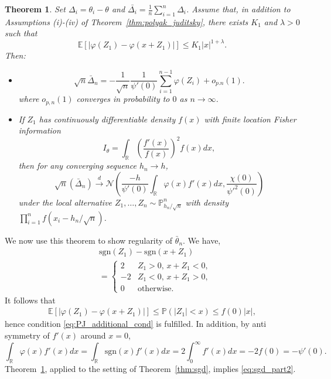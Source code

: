 \documentclass[letterpaper, 11pt]{IEEEtran}      %
\newtheorem{thm}{\bf{Theorem}}
\newcommand{\ex}[1]{\ensuremath{\mathbb{E}\left[ #1\right]}}
\newcommand{\sgn}{\mathrm{sgn} }
\newcommand{\Prob}{\mathbb{P} }
\newcommand{\Ncal}{\mathcal{N}}
\begin{document}
\begin{thm} \label{thm:normal_expansion}
Set $\Delta_i = \theta_i - \theta$ and
$\bar{\Delta_i} = \frac{1}{n} \sum_{i=1}^n \Delta_i$. Assume that, in addition to Assumptions (i)-(iv) of Theorem~\ref{thm:polyak_juditsky}, there exists $K_1$ and $\lambda>0$ such that
\begin{equation}
\ex{\left| \varphi(Z_1) - \varphi(x+Z_1)  \right|} \leq K_1 |x|^{1+\lambda}
\label{eq:PJ_additional_cond}. 
\end{equation}
Then:
\begin{itemize}
\item[(i)] \begin{equation}
\sqrt{n} \bar{\Delta}_n = -\frac{1}{\sqrt{n}} \frac{1}{\psi'(0)} \sum_{i=1}^{n-1} \varphi(Z_i)+ o_{p.n}(1). \label{eq:normal_expansion_lem}
\end{equation}
where $o_{p,n}(1)$ converges in probability to $0$ as $n\to \infty$.
\item[(ii)] If $Z_1$ has continuously differentiable density $f(x)$ with finite location Fisher information 
\[
I_\theta = \int_{\mathbb R} \left( \frac{f'(x)}{f(x)} \right)^2 f(x) dx,
\]
then for any converging sequence $h_n \to h$,
\[
\sqrt{n} \left( \bar{\Delta}_n \right) \overset{d}{\to} \Ncal\left( \frac{-h}{\psi'(0)} \int_{\mathbb R} \varphi(x) f'(x) dx  , \frac{\chi(0)}{\psi'^2(0)} \right)
\]
under the local alternative $Z_1,\ldots,Z_n \sim \Prob^n_{h_n/\sqrt{n}}$ with density $\prod_{i=1}^n f(x_i-h_n/\sqrt{n})$.
\end{itemize}
\end{thm}
We now use this theorem to show regularity of $\bar{\theta}_n$. We have, 
\begin{align*}
& %
\sgn(Z_1) - \sgn(x + Z_1) \\
& = \begin{cases}
2 & Z_1 > 0,\, x+Z_1<0, \\
-2 & Z_1 <0, \, x+Z_1>0, \\
0 & \text{otherwise}. 
\end{cases}
\end{align*}
It follows that
\begin{align*}
\ex{ \left| \varphi(Z_1) - \varphi(x+Z_1) \right| }  \leq \Prob\left( |Z_1| < x  \right) \leq f(0) |x|, 
\end{align*}
hence condition \eqref{eq:PJ_additional_cond} is fulfilled. In addition, by anti symmetry of $f'(x)$ around $x=0$, 
\[
\int_{\mathbb R} \varphi(x) f'(x) dx = \int_{\mathbb R} \sgn(x) f'(x) dx = 2\int_0^\infty f'(x) dx = -2f(0) = -\psi'(0). 
\]
Theorem~\ref{thm:normal_expansion}, applied to the setting of Theorem~\ref{thm:sgd}, implies \eqref{eq:sgd_part2}. 
\end{document}
